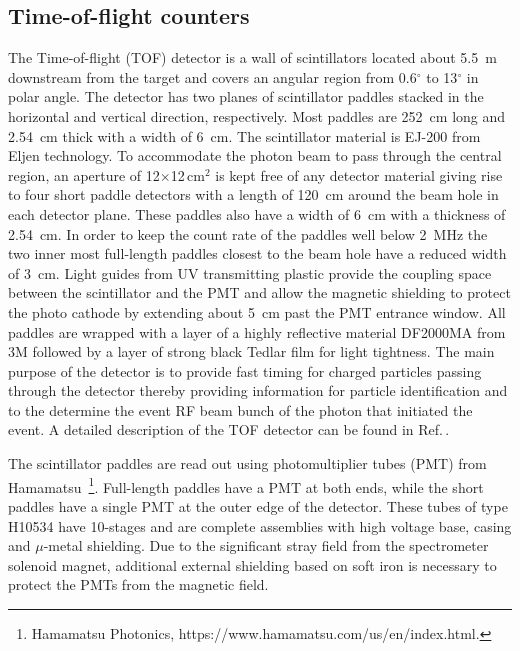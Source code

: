 \subsection[Time-of-flight counters]{Time-of-flight counters \label{sec:tof}}
The Time-of-flight (TOF) detector is a wall of scintillators located about 5.5~m downstream from the target and covers 
an angular region from 0.6$^{\circ}$ to 13$^{\circ}$ in polar angle. The detector has two planes of
scintillator paddles stacked in the horizontal and vertical direction, respectively. Most paddles are 252~cm long and 2.54~cm
thick with a width of 6~cm. 
The scintillator material is EJ-200 from Eljen technology.
To accommodate the photon beam to pass through the central region,
an aperture of 12$\times$12\,cm$^2$ is kept
free of any detector material giving rise to four short paddle detectors with a length of 120~cm around the beam hole
in each detector plane. These paddles also have a width of 6~cm with a thickness of 2.54~cm. In order to keep the
count rate of the paddles well below 2~MHz the two inner most full-length paddles closest to the beam hole have a reduced width of 3~cm.
Light guides from UV transmitting plastic provide the coupling space between the scintillator and the PMT and allow the 
magnetic shielding to protect the photo cathode by extending about 5~cm past the PMT entrance window. All paddles are wrapped
with a layer of a highly reflective material DF2000MA from 3M followed by a layer of strong black Tedlar film for light tightness. 
The main purpose of the detector is to provide fast timing for charged particles passing through the detector thereby providing information for particle identification and to the determine the event RF beam bunch of the photon that initiated the event. A detailed description of the TOF detector can be found in Ref.\,\cite{GlueXTOFNIM}. 

The scintillator paddles are read out using 
photomultiplier tubes (PMT) from Hamamatsu~\footnote{Hamamatsu Photonics, https://www.hamamatsu.com/us/en/index.html.}. Full-length paddles
have a PMT at both ends, while the short paddles have a single PMT
at the outer edge of the detector. These tubes of type H10534 have 10-stages and are complete assemblies with high voltage base, casing and $\mu$-metal shielding. Due to the significant stray field from the spectrometer solenoid magnet, additional external
shielding based on soft iron is necessary to protect the PMTs from the magnetic field.


